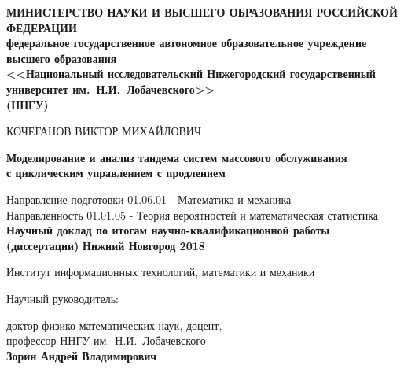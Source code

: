 \documentclass[10pt]{extarticle}
\begin{document}
\begin{titlepage}

  \begin{center}
    \textbf{МИНИСТЕРСТВО НАУКИ И ВЫСШЕГО ОБРАЗОВАНИЯ РОССИЙСКОЙ ФЕДЕРАЦИИ\\
    федеральное государственное автономное образовательное учреждение
    высшего образования\\ {\large <<Национальный исследовательский Нижегородский государственный университет им.~Н.И.~Лобачевского>>  \\(ННГУ)}}
    
    \vfill 
    
    {\Large КОЧЕГАНОВ ВИКТОР МИХАЙЛОВИЧ
    \bigskip
    \bigskip
    \bigskip

     \textbf{Моделирование и анализ тандема систем массового обслуживания\\ с циклическим управлением с продлением}
    }
    
    \bigskip
    \bigskip
    {\large Направление подготовки 	01.06.01 - Математика и механика \\
    Направленность  01.01.05 - Теория вероятностей и математическая статистика\\
    }
    \bigskip
    \bigskip
        \bigskip
    \bigskip
            \bigskip
    \bigskip
    \textbf{\Large Научный доклад по итогам научно-квалификационной работы\\
    (диссертации)}
        \vfill 
    \vfill 
    \vfill 
    \textbf{\large Нижний Новгород 2018}
  \end{center}
  
\end{titlepage}

\thispagestyle{empty}

{\large Институт информационных технологий, математики и механики\\
\medskip

Научный руководитель:

\medskip
 доктор физико-математических наук, доцент,\\
\indent профессор ННГУ им.~Н.И.~Лобачевского\\
\indent \textbf{Зорин Андрей Владимирович}
}
\end{document}
